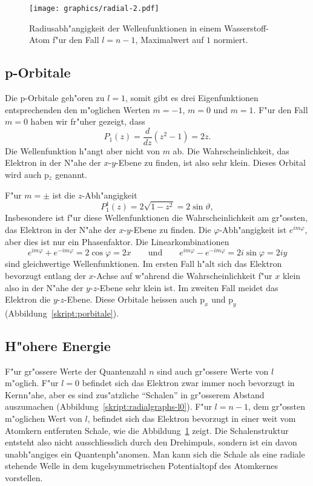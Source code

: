 \begin{figure}
\centering
\texttt{[image: graphics/radial-2.pdf]}
\caption{Radiusabh"angigkeit der Wellenfunktionen in einem Wasserstoff-Atom
f"ur den Fall $l=n-1$,
Maximalwert auf $1$ normiert.
\label{skript:radialgraphs-maxl}}
\end{figure}

\subsection{p-Orbitale}
Die p-Orbitale geh"oren zu $l=1$, somit gibt es drei Eigenfunktionen
entsprechenden den m"oglichen Werten $m=-1$, $m=0$ und $m=1$.
F"ur den Fall $m=0$ haben wir fr"uher gezeigt, dass
\[
P_1(z)=\frac{d}{dz}(z^2-1)=2z.
\]
Die Wellenfunktion h"angt aber nicht von $m$ ab.
Die Wahrscheinlichkeit, das Elektron in der N"ahe der $x$-$y$-Ebene
zu finden, ist also sehr klein.
Dieses Orbital wird auch p$\mathstrut_z$ genannt.

F"ur $m=\pm$ ist die $z$-Abh"angigkeit
\[
P_1^1(z)=2\sqrt{1-z^2} = 2\sin\vartheta,
\]
Insbesondere ist f"ur diese Wellenfunktionen die Wahrscheinlichkeit 
am gr"ossten, das Elektron in der N"ahe der $x$-$y$-Ebene zu finden.
Die $\varphi$-Abh"angigkeit ist $e^{im\varphi}$, aber dies ist
nur ein Phasenfaktor.
Die Linearkombinationen
\[
e^{im\varphi}+e^{-im\varphi}=2\cos\varphi=2x
\qquad\text{und}\qquad
e^{im\varphi}-e^{-im\varphi}=2i\sin\varphi=2iy
\]
sind gleichwertige Wellenfunktionen.
Im ersten Fall h"alt sich das Elektron bevorzugt entlang der $x$-Achse
auf w"ahrend die Wahrscheinlichkeit f"ur $x$ klein also in der N"ahe der
$y$-$z$-Ebene sehr klein ist.
Im zweiten Fall meidet das Elektron die $y$-$z$-Ebene.
Diese Orbitale heissen auch $\text{p}_x$ und $\text{p}_y$
(Abbildung~\ref{skript:porbitale}).

\subsection{H"ohere Energie}
F"ur gr"ossere Werte der Quantenzahl $n$ sind auch gr"ossere Werte
von $l$ m"oglich.
F"ur $l=0$ befindet sich das Elektron zwar immer noch bevorzugt in 
Kernn"ahe, aber es sind zus"atzliche ``Schalen'' in gr"osserem Abstand
auszumachen (Abbildung~\ref{skript:radialgraphs-l0}).
F"ur $l=n-1$, dem gr"ossten m"oglichen Wert von $l$,
befindet sich das Elektron
bevorzugt in einer weit vom Atomkern entfernten Schale, wie die
Abbildung~\ref{skript:radialgraphs-maxl} zeigt.
Die Schalenstruktur entsteht also nicht ausschliesslich durch den 
Drehimpuls, sondern ist ein davon unabh"angiges ein Quantenph"anomen.
Man kann sich die Schale als eine radiale stehende Welle in dem
kugelsymmetrischen Potentialtopf des Atomkernes vorstellen.

